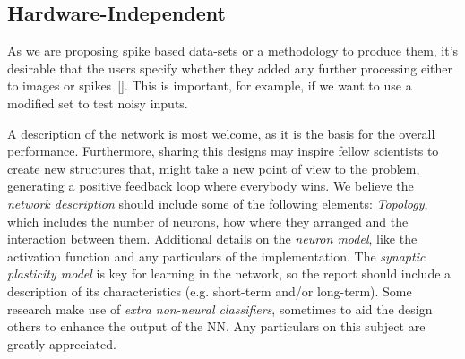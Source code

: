 \subsection{Hardware-Independent}
As we are proposing spike based data-sets or a methodology to produce them, it's desirable that the users specify whether they added any further processing either to images or spikes~[\cite{best-practice-nn-img}]. This is important, for example, if we want to use a modified set to test noisy inputs.

A description of the network is most welcome, as it is the basis for the overall performance. Furthermore, sharing this designs may inspire fellow scientists to create new structures that, might take a new point of view to the problem, generating a positive feedback loop where everybody wins. We believe the \emph{network description} should include some of the following elements:
    \textit{Topology}, %
    which includes the number of neurons, how where they arranged and the interaction between them. 
    Additional details on the \textit{neuron model}, %
    like the activation function and any particulars of the implementation.
    The \textit{synaptic plasticity model} %
    is key for learning in the network, so the report should include a description of its characteristics (e.g. short-term and/or long-term).
      Some research make use of \emph{extra non-neural classifiers}, sometimes to aid the design others to enhance the output of the NN. Any particulars on this subject are greatly appreciated.


